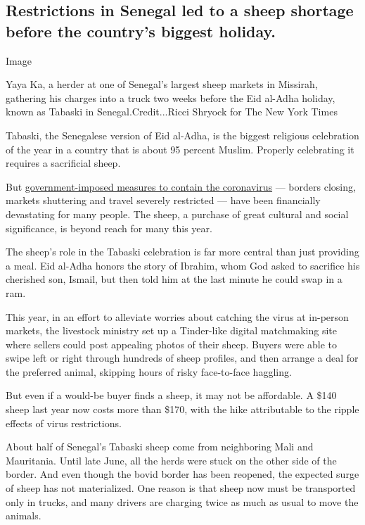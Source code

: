 \hypertarget{restrictions-in-senegal-led-to-a-sheep-shortage-before-the-countrys-biggest-holiday}{%
\subsection{Restrictions in Senegal led to a sheep shortage before the
country's biggest
holiday.}\label{restrictions-in-senegal-led-to-a-sheep-shortage-before-the-countrys-biggest-holiday}}

Image

Yaya Ka, a herder at one of Senegal's largest sheep markets in Missirah,
gathering his charges into a truck two weeks before the Eid al-Adha
holiday, known as Tabaski in Senegal.Credit...Ricci Shryock for The New
York Times

Tabaski, the Senegalese version of Eid al-Adha, is the biggest religious
celebration of the year in a country that is about 95 percent Muslim.
Properly celebrating it requires a sacrificial sheep.

But
\href{https://www.nytimes3xbfgragh.onion/2020/07/29/world/africa/senegal-tabaski-sheep-eid-adha.html}{government-imposed
measures to contain the coronavirus} --- borders closing, markets
shuttering and travel severely restricted --- have been financially
devastating for many people. The sheep, a purchase of great cultural and
social significance, is beyond reach for many this year.

The sheep's role in the Tabaski celebration is far more central than
just providing a meal. Eid al-Adha honors the story of Ibrahim, whom God
asked to sacrifice his cherished son, Ismail, but then told him at the
last minute he could swap in a ram.

This year, in an effort to alleviate worries about catching the virus at
in-person markets, the livestock ministry set up a Tinder-like digital
matchmaking site where sellers could post appealing photos of their
sheep. Buyers were able to swipe left or right through hundreds of sheep
profiles, and then arrange a deal for the preferred animal, skipping
hours of risky face-to-face haggling.

But even if a would-be buyer finds a sheep, it may not be affordable. A
\$140 sheep last year now costs more than \$170, with the hike
attributable to the ripple effects of virus restrictions.

About half of Senegal's Tabaski sheep come from neighboring Mali and
Mauritania. Until late June, all the herds were stuck on the other side
of the border. And even though the bovid border has been reopened, the
expected surge of sheep has not materialized. One reason is that sheep
now must be transported only in trucks, and many drivers are charging
twice as much as usual to move the animals.

